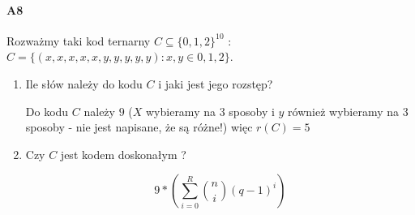 \paragraph{A8} Rozważmy taki kod ternarny $C \subseteq \{0, 1, 2\}^{10}$ : $C = \{(x, x, x, x, x, y, y, y, y, y): x, y \in {0, 1, 2}\}$.
\begin{enumerate}[label=\alph*)]
\item Ile słów należy do kodu $C$ i jaki jest jego rozstęp?

Do kodu $C$ należy $9$ ($X$ wybieramy na 3 sposoby i $y$ również wybieramy na 3 sposoby - nie jest napisane, że są różne!) więc $r(C)=5$
\item Czy $C$ jest kodem doskonałym ?

$$9*\left(\sum _{i=0}^R \binom{n}{i}(q-1)^i\right)$$
\end{enumerate}

